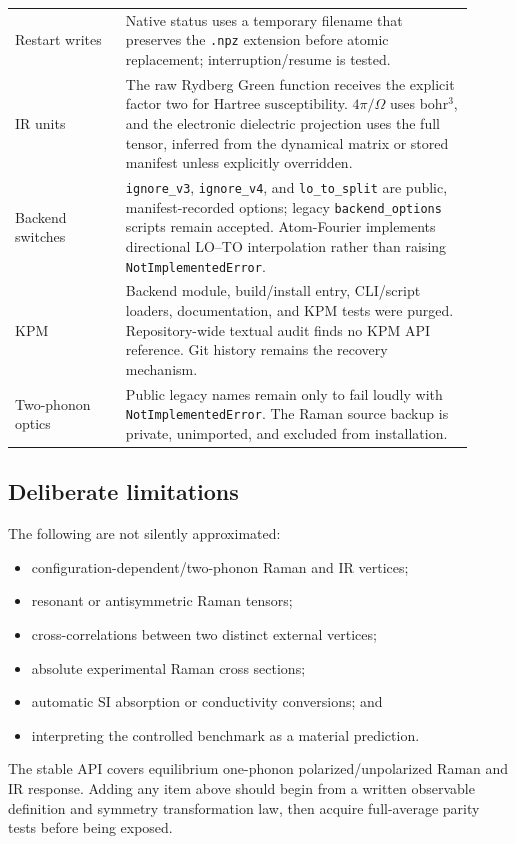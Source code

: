 \documentclass[11pt,a4paper]{article}
\begin{document}
\begin{longtable}{@{}p{0.22\linewidth}p{0.69\linewidth}@{}}
Restart writes & Native status uses a temporary filename that preserves the
\texttt{.npz} extension before atomic replacement; interruption/resume is
tested.\\[3pt]
IR units & The raw Rydberg Green function receives the explicit factor two for
Hartree susceptibility.  $4\pi/\Omega$ uses bohr$^3$, and the electronic
dielectric projection uses the full tensor, inferred from the dynamical
matrix or stored manifest unless explicitly overridden.\\[3pt]
Backend switches & \texttt{ignore\_v3}, \texttt{ignore\_v4}, and
\texttt{lo\_to\_split} are public, manifest-recorded options; legacy
\texttt{backend\_options} scripts remain accepted.  Atom-Fourier implements
directional LO--TO interpolation rather than raising
\texttt{NotImplementedError}.\\[3pt]
KPM & Backend module, build/install entry, CLI/script loaders, documentation,
and KPM tests were purged.  Repository-wide textual audit finds no KPM API
reference.  Git history remains the recovery mechanism.\\[3pt]
Two-phonon optics & Public legacy names remain only to fail loudly with
\texttt{NotImplementedError}.  The Raman source backup is private, unimported,
and excluded from installation.\\
\bottomrule
\end{longtable}

\subsection{Deliberate limitations}

The following are not silently approximated:
\begin{itemize}
  \item configuration-dependent/two-phonon Raman and IR vertices;
  \item resonant or antisymmetric Raman tensors;
  \item cross-correlations between two distinct external vertices;
  \item absolute experimental Raman cross sections;
  \item automatic SI absorption or conductivity conversions; and
  \item interpreting the controlled benchmark as a material prediction.
\end{itemize}
The stable API covers equilibrium one-phonon polarized/unpolarized Raman and
IR response.  Adding any item above should begin from a written observable
definition and symmetry transformation law, then acquire full-average parity
tests before being exposed.
\end{document}
